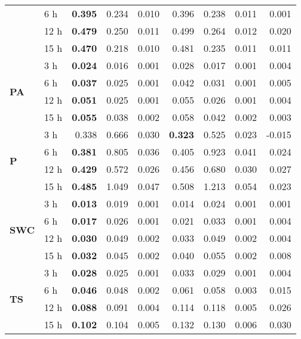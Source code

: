 \begin{table}
\begin{tabular}{p{2.1cm}l|rrr|rrr|r}
 & 6 h & \bfseries 0.395 & 0.234 & 0.010 & 0.396 & 0.238 & 0.011 & 0.001 \\
 & 12 h & \bfseries 0.479 & 0.250 & 0.011 & 0.499 & 0.264 & 0.012 & 0.020 \\
 & 15 h & \bfseries 0.470 & 0.218 & 0.010 & 0.481 & 0.235 & 0.011 & 0.011 \\
\cline{1-9}
\multirow[c]{4}{*}{\textbf{PA}} & 3 h & \bfseries 0.024 & 0.016 & 0.001 & 0.028 & 0.017 & 0.001 & 0.004 \\
 & 6 h & \bfseries 0.037 & 0.025 & 0.001 & 0.042 & 0.031 & 0.001 & 0.005 \\
 & 12 h & \bfseries 0.051 & 0.025 & 0.001 & 0.055 & 0.026 & 0.001 & 0.004 \\
 & 15 h & \bfseries 0.055 & 0.038 & 0.002 & 0.058 & 0.042 & 0.002 & 0.003 \\
\cline{1-9}
\multirow[c]{4}{*}{\textbf{P}} & 3 h & 0.338 & 0.666 & 0.030 & \bfseries 0.323 & 0.525 & 0.023 & -0.015 \\
 & 6 h & \bfseries 0.381 & 0.805 & 0.036 & 0.405 & 0.923 & 0.041 & 0.024 \\
 & 12 h & \bfseries 0.429 & 0.572 & 0.026 & 0.456 & 0.680 & 0.030 & 0.027 \\
 & 15 h & \bfseries 0.485 & 1.049 & 0.047 & 0.508 & 1.213 & 0.054 & 0.023 \\
\cline{1-9}
\multirow[c]{4}{*}{\textbf{SWC}} & 3 h & \bfseries 0.013 & 0.019 & 0.001 & 0.014 & 0.024 & 0.001 & 0.001 \\
 & 6 h & \bfseries 0.017 & 0.026 & 0.001 & 0.021 & 0.033 & 0.001 & 0.004 \\
 & 12 h & \bfseries 0.030 & 0.049 & 0.002 & 0.033 & 0.049 & 0.002 & 0.004 \\
 & 15 h & \bfseries 0.032 & 0.045 & 0.002 & 0.040 & 0.055 & 0.002 & 0.008 \\
\cline{1-9}
\multirow[c]{4}{*}{\textbf{TS}} & 3 h & \bfseries 0.028 & 0.025 & 0.001 & 0.033 & 0.029 & 0.001 & 0.004 \\
 & 6 h & \bfseries 0.046 & 0.048 & 0.002 & 0.061 & 0.058 & 0.003 & 0.015 \\
 & 12 h & \bfseries 0.088 & 0.091 & 0.004 & 0.114 & 0.118 & 0.005 & 0.026 \\
 & 15 h & \bfseries 0.102 & 0.104 & 0.005 & 0.132 & 0.130 & 0.006 & 0.030 \\
\cline{1-9}
\bottomrule
\end{tabular}
\end{table}
